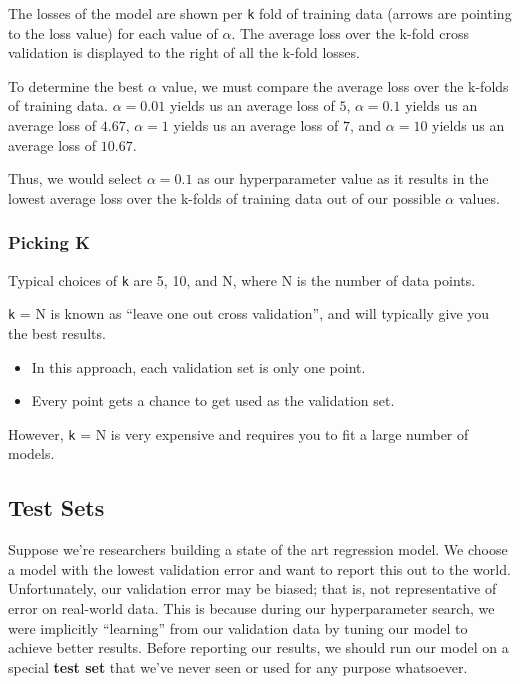 \documentclass[
  letterpaper,
  DIV=11,
  numbers=noendperiod]{scrreprt}
\providecommand{\tightlist}{%
  \setlength{\itemsep}{0pt}\setlength{\parskip}{0pt}}\usepackage{longtable,booktabs,array}
\begin{document}
The losses of the model are shown per \texttt{k} fold of training data
(arrows are pointing to the loss value) for each value of \(\alpha\).
The average loss over the k-fold cross validation is displayed to the
right of all the k-fold losses.

To determine the best \(\alpha\) value, we must compare the average loss
over the k-folds of training data. \(\alpha = 0.01\) yields us an
average loss of \(5\), \(\alpha = 0.1\) yields us an average loss of
\(4.67\), \(\alpha = 1\) yields us an average loss of \(7\), and
\(\alpha = 10\) yields us an average loss of \(10.67\).

Thus, we would select \(\alpha = 0.1\) as our hyperparameter value as it
results in the lowest average loss over the k-folds of training data out
of our possible \(\alpha\) values.

\hypertarget{picking-k}{%
\subsubsection{Picking K}\label{picking-k}}

Typical choices of \texttt{k} are 5, 10, and N, where N is the number of
data points.

\texttt{k} = N is known as ``leave one out cross validation'', and will
typically give you the best results.

\begin{itemize}
\tightlist
\item
  In this approach, each validation set is only one point.
\item
  Every point gets a chance to get used as the validation set.
\end{itemize}

However, \texttt{k} = N is very expensive and requires you to fit a
large number of models.

\hypertarget{test-sets}{%
\subsection{Test Sets}\label{test-sets}}

Suppose we're researchers building a state of the art regression model.
We choose a model with the lowest validation error and want to report
this out to the world. Unfortunately, our validation error may be
biased; that is, not representative of error on real-world data. This is
because during our hyperparameter search, we were implicitly
``learning'' from our validation data by tuning our model to achieve
better results. Before reporting our results, we should run our model on
a special \textbf{test set} that we've never seen or used for any
purpose whatsoever.
\end{document}
